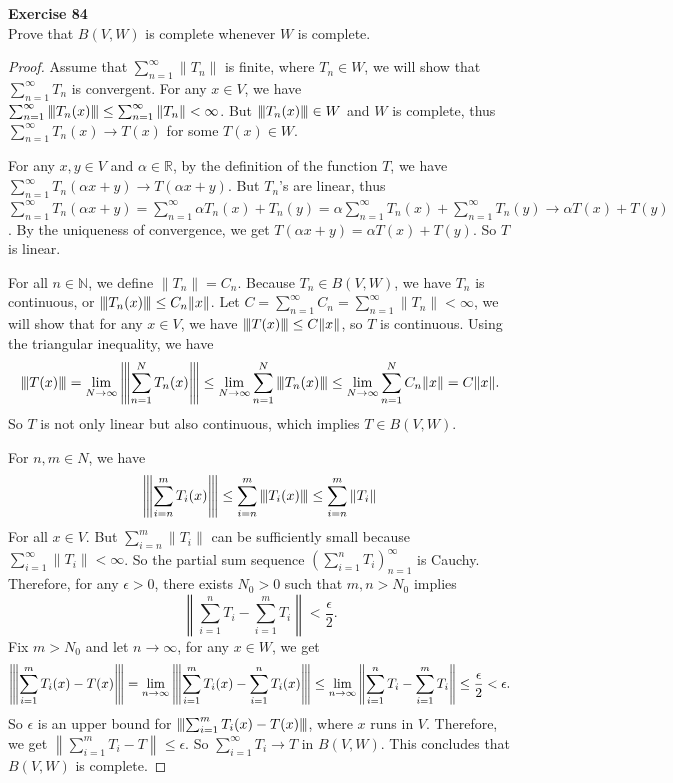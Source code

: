 \documentclass[12pt, a4paper]{article}
\theoremstyle{plain}
\newcommand{\vertiii}[1]{{\left\vert\kern-0.25ex\left\vert\kern-0.25ex\left\vert #1 
    \right\vert\kern-0.25ex\right\vert\kern-0.25ex\right\vert}}
\newcommand{\N}{\mathbb{N}}
\newcommand{\R}{\mathbb{R}}
\newenvironment{exercise}[2][Exercise]
    { \begin{mdframed}[backgroundcolor=gray!20] \textbf{#1 #2} \\}
    {  \end{mdframed}}
\begin{document}
\begin{exercise}{84}
Prove that $B(V,W)$ is complete whenever $W$ is complete.
\end{exercise}
	\begin{proof}
	Assume that $\sum_{n=1}^{\infty}{\|T_n\|}$ is finite, where $T_n \in W$, we will show that $\sum_{n=1}^{\infty}{T_n}$ is convergent. For any $x\in V$, we have $\sum_{n=1}^{\infty}{\vertiii{T_n(x)}}\leq \sum_{n=1}^{\infty}{\|T_n\|}<\infty$. But $\vertiii{T_n(x)}\in W$ and $W$ is complete, thus $\sum_{n=1}^{\infty}{T_n(x)}\rightarrow T(x)$ for some $T(x)\in W$.
	
	For any $x,y\in V$ and $\alpha\in\R$, by the definition of the function $T$, we have $\sum_{n=1}^{\infty}{T_n(\alpha x+y)}\rightarrow T(\alpha x+y)$. But $T_n$'s are linear, thus $\sum_{n=1}^{\infty}{T_n(\alpha x+y)}=\sum_{n=1}^{\infty}{\alpha T_n(x)+T_n(y)}=\alpha\sum_{n=1}^{\infty}{T_n(x)}+\sum_{n=1}^{\infty}{T_n(y)}\rightarrow\alpha T(x)+T(y)$. By the uniqueness of convergence, we get $T(\alpha x+y)=\alpha T(x)+T(y)$. So $T$ is linear.
	
	For all $n\in\N$, we define $\|T_n\|=C_n$. Because $T_n\in B(V,W)$, we have $T_n$ is continuous, or $\vertiii{T_n(x)}\leq C_n\|x\|$. Let $C=\sum_{n=1}^{\infty}{C_n}=\sum_{n=1}^{\infty}{\|T_n\|}<\infty$, we will show that for any $x\in V$, we have $\vertiii{T(x)}\leq C\|x\|$, so $T$ is continuous. Using the triangular inequality, we have
	\[
	\vertiii{T(x)}=\lim_{N\rightarrow \infty}\vertiii{\sum_{n=1}^{N}{T_n(x)}}\leq \lim_{N\rightarrow\infty}\sum_{n=1}^{N}{\vertiii{T_n(x)}}\leq \lim_{N\rightarrow\infty}\sum_{n=1}^{N}{C_n\|x\|}=C\|x\|.
	\]
	So $T$ is not only linear but also continuous, which implies $T\in B(V,W)$.
	
	For $n,m\in N$, we have
	\[
	\vertiii{\sum_{i=n}^{m}{T_i(x)}}\leq \sum_{i=n}^{m}{\vertiii{T_i(x)}}\leq \sum_{i=n}^{m}{\|T_i\|}
	\]
	For all $x\in V$. But $\sum_{i=n}^{m}{\|T_i\|}$ can be sufficiently small because $\sum_{i=1}^{\infty}{\|T_i\|}<\infty$. So the partial sum sequence $\left(\sum_{i=1}^{n}{T_i}\right)_{n=1}^\infty$ is Cauchy. Therefore, for any $\epsilon>0$, there exists $N_0>0$ such that $m,n>N_0$ implies
	\[
	\left\|\sum_{i=1}^{n}{T_i}-\sum_{i=1}^{m}{T_i}\right\|<\frac{\epsilon}{2}.
	\] 
	Fix $m>N_0$ and let $n\rightarrow\infty$, for any $x\in W$, we get 
	\[
	\vertiii{\sum_{i=1}^{m}{T_i(x)}-T(x)}=\lim_{n\rightarrow\infty}\vertiii{\sum_{i=1}^{m}{T_i(x)}-\sum_{i=1}^{n}{T_i(x)}}\leq \lim_{n\rightarrow\infty}\left\|\sum_{i=1}^{n}{T_i}-\sum_{i=1}^{m}{T_i}\right\|\leq\frac{\epsilon}{2}<\epsilon.
	\]
	So $\epsilon$ is an upper bound for $\vertiii{\sum_{i=1}^{m}{T_i(x)}-T(x)}$, where $x$ runs in $V$. Therefore, we get $\left\|\sum_{i=1}^{m}{T_i}-T\right\|\leq \epsilon$. So $\sum_{i=1}^{\infty}{T_i}\rightarrow T$ in $B(V,W)$. This concludes that $B(V,W)$ is complete.
	\end{proof}
\end{document}
